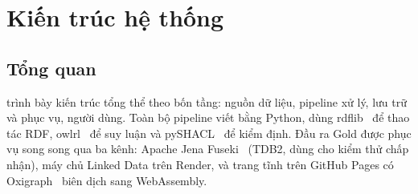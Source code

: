 \documentclass[12pt,a4paper]{article}
\begin{document}
\section{Kiến trúc hệ thống}\label{sec:arch}

\subsection{Tổng quan}
 trình bày kiến trúc tổng thể theo bốn tầng: nguồn dữ liệu, pipeline xử lý, lưu trữ và phục vụ, người
dùng. Toàn bộ pipeline viết bằng Python, dùng rdflib~\cite{rdflib} để thao tác RDF, owlrl~\cite{owlrl} để suy luận và
pySHACL~\cite{pyshacl} để kiểm định. Đầu ra Gold được phục vụ song song qua ba kênh: Apache Jena Fuseki~\cite{jenafuseki}
(TDB2, dùng cho kiểm thử chấp nhận), máy chủ Linked Data trên Render, và trang tĩnh trên GitHub Pages có
Oxigraph~\cite{oxigraph} biên dịch sang WebAssembly.
\end{document}
